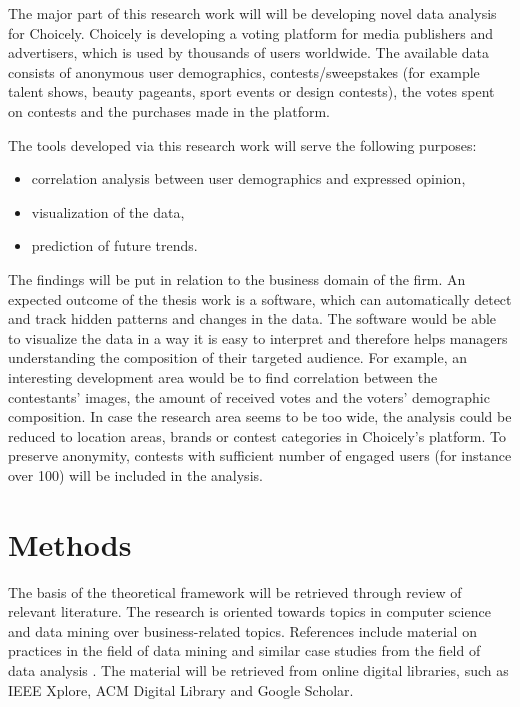 \documentclass[english]{../tktltiki}
\begin{document}
	The major part of this research work will will be developing novel data analysis for Choicely. Choicely is developing a voting platform for media publishers and advertisers, which is used by thousands of users worldwide. The available data consists of anonymous user demographics, contests/sweepstakes (for example talent shows, beauty pageants, sport events or design contests), the votes spent on  contests and the purchases made in the platform. 
	
	The tools developed via this research work will serve the following purposes: 
	
	\begin{itemize}
		\item correlation analysis between user demographics and expressed opinion, 
		\item visualization of the data,
		\item prediction of future trends.
	\end{itemize}
	
	The findings will be put in relation to the business domain of the firm. An expected outcome of the thesis work is a software, which can automatically detect and track hidden patterns and changes in the data. The software would be able to visualize the data in a way it is easy to interpret and therefore helps managers understanding the composition of their targeted audience. For example, an interesting development area would be to find correlation between the contestants' images, the amount of received votes and the voters' demographic composition. In case the research area seems to be too wide, the analysis could be reduced to location areas, brands or contest categories in Choicely's platform. To preserve anonymity, contests with sufficient number of engaged users (for instance over 100) will be included in the analysis. 
	
\section{Methods}
    The basis of the theoretical framework will be retrieved through review of relevant literature. The research is oriented towards topics in computer science and data mining over business-related topics. References include material on practices in the field of data mining \cite{witten2016data, introtodatamining, inmon2007tapping, bose2001business, data_mining_and_knowledge_discovery, datamininginbusinessprocesses} and similar case studies from the field of data analysis \cite{data_mining_in_educational_science, monetisingusergeneratedcontent, zarsky2002mine, saraee2004data}. The material will be retrieved from online digital libraries, such as IEEE Xplore, ACM Digital Library and Google Scholar. 
    
\end{document}
